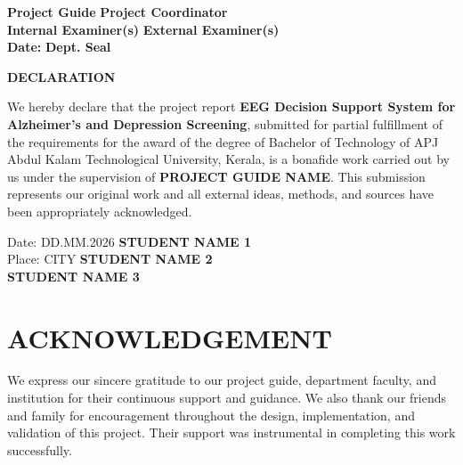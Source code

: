 \documentclass[12pt,a4paper]{report}
\begin{document}
\vspace{1cm}
\noindent \textbf{Project Guide} \hfill \textbf{Project Coordinator} \\

\vspace{2cm}
\noindent \textbf{Internal Examiner(s)} \hfill \textbf{External Examiner(s)}\\

\vspace{1cm}
\noindent \textbf{Date:} \hfill \textbf{Dept. Seal}

\thispagestyle{empty}
\clearpage

\begin{center}
    \textbf{\Huge DECLARATION}
\end{center}

\normalsize
\justifying
We hereby declare that the project report \textbf{EEG Decision Support System for Alzheimer's and Depression Screening}, submitted for partial fulfillment of the requirements for the award of the degree of Bachelor of Technology of APJ Abdul Kalam Technological University, Kerala, is a bonafide work carried out by us under the supervision of \textbf{PROJECT GUIDE NAME}. This submission represents our original work and all external ideas, methods, and sources have been appropriately acknowledged.

\vspace{2cm}
\noindent Date: DD.MM.2026 \hfill \textbf{STUDENT NAME 1}\\
\noindent Place: CITY \hfill \textbf{STUDENT NAME 2}\\
\hspace*{\fill} \textbf{STUDENT NAME 3}

\thispagestyle{empty}
\clearpage

\setcounter{page}{1}
\chapter*{ACKNOWLEDGEMENT}

\justifying
We express our sincere gratitude to our project guide, department faculty, and institution for their continuous support and guidance. We also thank our friends and family for encouragement throughout the design, implementation, and validation of this project. Their support was instrumental in completing this work successfully.
\end{document}
